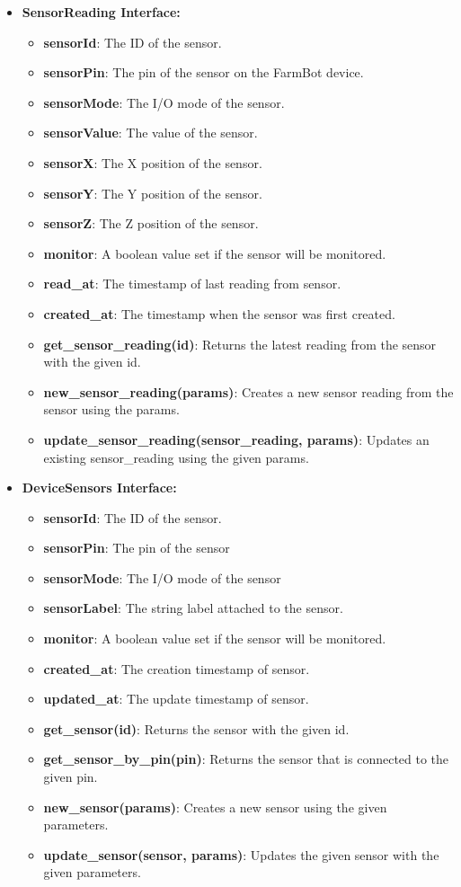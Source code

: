\begin{itemize}
    \item \textbf{SensorReading Interface:} \begin{itemize}
        \item \textbf{sensorId}: The ID of the sensor.
        \item \textbf{sensorPin}: The pin of the sensor on the FarmBot device.
        \item \textbf{sensorMode}: The I/O mode of the sensor.
        \item \textbf{sensorValue}: The value of the sensor.
        \item \textbf{sensorX}: The X position of the sensor.
        \item \textbf{sensorY}: The Y position of the sensor.
        \item \textbf{sensorZ}: The Z position of the sensor.
        \item \textbf{monitor}: A boolean value set if the sensor will be monitored.
        \item \textbf{read\_at}: The timestamp of last reading from sensor.
        \item \textbf{created\_at}: The timestamp when the sensor was first created.
        \item \textbf{get\_sensor\_reading(id)}: Returns the latest reading from the sensor with the given id.
        \item \textbf{new\_sensor\_reading(params)}: Creates a new sensor reading from the sensor using the params.
        \item \textbf{update\_sensor\_reading(sensor\_reading, params)}: Updates an existing sensor\_reading using the given params.
    \end{itemize}

    \item \textbf{DeviceSensors Interface:} \begin{itemize}
        \item \textbf{sensorId}: The ID of the sensor.
        \item \textbf{sensorPin}: The pin of the sensor
        \item \textbf{sensorMode}: The I/O mode of the sensor
        \item \textbf{sensorLabel}: The string label attached to the sensor.
        \item \textbf{monitor}: A boolean value set if the sensor will be monitored.
        \item \textbf{created\_at}: The creation timestamp of sensor.
        \item \textbf{updated\_at}: The update timestamp of sensor.
        \item \textbf{get\_sensor(id)}: Returns the sensor with the given id.
        \item \textbf{get\_sensor\_by\_pin(pin)}: Returns the sensor that is connected to the given pin.
        \item \textbf{new\_sensor(params)}: Creates a new sensor using the given parameters.
        \item \textbf{update\_sensor(sensor, params)}: Updates the given sensor with the given parameters.
    \end{itemize}
    

\end{itemize}

